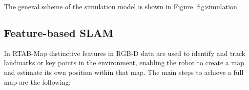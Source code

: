 The general scheme of the simulation model is shown in Figure \ref{fig:simulation}.

\subsection{Feature-based SLAM}

In RTAB-Map distinctive features in RGB-D data  are used to identify and track landmarks or key points in the environment, enabling the robot to create a map and estimate its own position within that map. The main steps to achieve a full map are the following:

